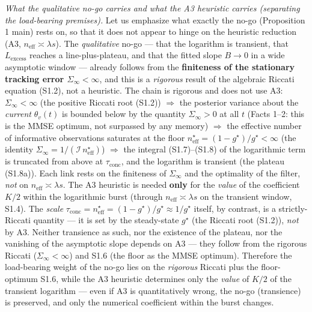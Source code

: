 \documentclass[12pt]{iopart}
\begin{document}
\emph{What the qualitative no-go carries and what the A3 heuristic carries (separating the load-bearing premises).} Let us emphasize what exactly the no-go (Proposition 1 main) rests on, so that it does not appear to hinge on the heuristic reduction (A3, \(n_{\text{eff}} \asymp \lambda s\)). The \emph{qualitative} no-go --- that the logarithm is transient, that \(L_{\text{excess}}\) reaches a line-plus-plateau, and that the fitted slope \(B \to 0\) in a wide asymptotic window --- already follows from the \textbf{finiteness of the stationary tracking error \(\Sigma_\infty < \infty\)}, and this is a \emph{rigorous} result of the algebraic Riccati equation (S1.2), not a heuristic. The chain is rigorous and does not use A3: \(\Sigma_\infty < \infty\) (the positive Riccati root (S1.2)) \(\Rightarrow\) the posterior variance about the \emph{current} \(\theta_v(t)\) is bounded below by the quantity \(\Sigma_\infty > 0\) at all \(t\) (Facts 1--2: this is the MMSE optimum, not surpassed by any memory) \(\Rightarrow\) the effective number of informative observations saturates at the floor \(n_{\text{eff}}^\star = (1-g^\star)/g^\star < \infty\) (the identity \(\Sigma_\infty = 1/(\mathcal I\,n_{\text{eff}}^\star)\)) \(\Rightarrow\) the integral (S1.7)--(S1.8) of the logarithmic term is truncated from above at \(\tau_{\text{conc}}\), and the logarithm is transient (the plateau (S1.8a)). Each link rests on the finiteness of \(\Sigma_\infty\) and the optimality of the filter, \emph{not} on \(n_{\text{eff}} \asymp \lambda s\). The A3 heuristic is needed \textbf{only} for the \emph{value} of the coefficient \(K/2\) within the logarithmic burst (through \(n_{\text{eff}} \asymp \lambda s\) on the transient window, S1.4). The \emph{scale} \(\tau_{\text{conc}} = n_{\text{eff}}^\star = (1-g^\star)/g^\star \approx 1/g^\star\) itself, by contrast, is a strictly-Riccati quantity --- it is set by the steady-state \(g^\star\) (the Riccati root (S1.2)), \emph{not} by A3. Neither transience as such, nor the existence of the plateau, nor the vanishing of the asymptotic slope depends on A3 --- they follow from the rigorous Riccati (\(\Sigma_\infty < \infty\)) and S1.6 (the floor as the MMSE optimum). Therefore the load-bearing weight of the no-go lies on the \emph{rigorous} Riccati plus the floor-optimum S1.6, while the A3 heuristic determines only the \emph{value} of \(K/2\) of the transient logarithm --- even if A3 is quantitatively wrong, the no-go (transience) is preserved, and only the numerical coefficient within the burst changes.
\end{document}
